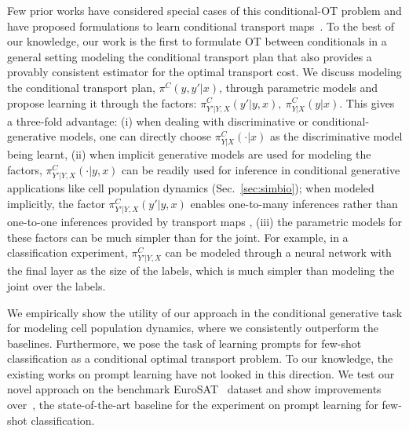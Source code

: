 Few prior works have considered special cases of this conditional-OT problem and have proposed formulations to learn conditional transport maps~\citep{Tabak21, Cuturi22}. To the best of our knowledge, our work is the first to formulate OT between conditionals in a general setting modeling the conditional transport plan that also provides a provably consistent estimator for the optimal transport cost. We discuss modeling the conditional transport plan, $\pi^C(y, y'|x)$, through parametric models and propose learning it through the factors: $\pi^C_{Y'|Y,X}(y'|y, x),\ \pi^C_{Y|X}(y|x)$. This gives a three-fold advantage: (i) when dealing with discriminative or conditional-generative models, one can directly choose $\pi^C_{Y|X}(\cdot|x)$ as the discriminative model being learnt, (ii) when implicit generative models are used for modeling the factors, $\pi^C_{Y'|Y,X}(\cdot|y,x)$ can be readily used for inference in conditional generative applications like cell population dynamics (Sec.~\ref{sec:simbio}); when modeled implicitly, the factor $\pi^C_{Y'|Y,X}(y'|y,x)$ enables one-to-many inferences rather than one-to-one inferences provided by transport maps \citep{korotin2023neural}, (iii) the parametric models for these factors can be much simpler than for the joint. For example, in a classification experiment, $\pi^C_{Y'|Y,X}$ can be modeled through a neural network with the final layer as the size of the labels, which is much simpler than modeling the joint over the labels.

We empirically show the utility of our approach in the conditional generative task for modeling cell population dynamics, where we consistently outperform the baselines. Furthermore, we pose the task of learning prompts for few-shot classification as a conditional optimal transport problem. To our knowledge, the existing works on prompt learning have not looked in this direction. We test our novel approach on the benchmark EuroSAT~\citep{helber2019eurosat} dataset and show improvements over~\cite{chen2023plot}, the state-of-the-art baseline for the experiment on prompt learning for few-shot classification.

